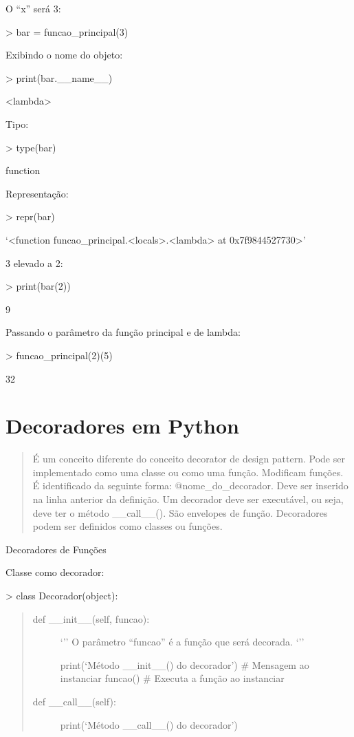\documentclass[letterpaper,10pt,brazil]{sphinxmanual}
\begin{document}
O “x” será 3:

\textgreater{} bar = funcao\_principal(3)

Exibindo o nome do objeto:

\textgreater{} print(bar.\_\_name\_\_)

\textless{}lambda\textgreater{}

Tipo:

\textgreater{} type(bar)

function

Representação:

\textgreater{} repr(bar)

‘\textless{}function funcao\_principal.\textless{}locals\textgreater{}.\textless{}lambda\textgreater{} at 0x7f9844527730\textgreater{}’

3 elevado a 2:

\textgreater{} print(bar(2))

9

Passando o parâmetro da função principal e de lambda:

\textgreater{} funcao\_principal(2)(5)

32


\chapter{Decoradores em Python}
\label{\detokenize{content/decorators:decoradores-em-python}}\label{\detokenize{content/decorators::doc}}\begin{quote}

É um conceito diferente do conceito decorator de design pattern.
Pode ser implementado como uma classe ou como uma função.
Modificam funções.
É identificado da seguinte forma: @nome\_do\_decorador.
Deve ser inserido na linha anterior da definição.
Um decorador deve ser executável, ou seja, deve ter o método \_\_call\_\_().
São envelopes de função.
Decoradores podem ser definidos como classes ou funções.
\end{quote}

Decoradores de Funções

Classe como decorador:

\textgreater{} class Decorador(object):
\begin{quote}
\begin{description}
\item[{def \_\_init\_\_(self, funcao):}] \leavevmode
‘’’
O parâmetro “funcao” é a função que será decorada.
‘’’

print(‘Método \_\_init\_\_() do decorador’)  \# Mensagem ao instanciar
funcao()  \# Executa a função ao instanciar

\item[{def \_\_call\_\_(self):}] \leavevmode
print(‘Método \_\_call\_\_() do decorador’)

\end{description}
\end{quote}
\end{document}
